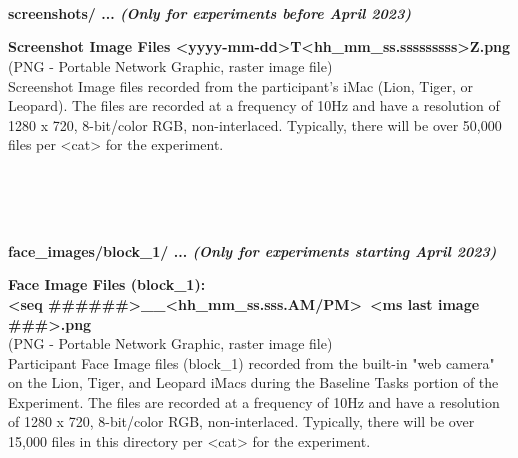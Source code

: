 \begin{description}
\textbf{\\\\\\}
\begin{addmargin}[0em]{0em} %
    \label{screenshots/<yyyy-mm-dd>T<hh_mm_ss.sssssssss>Z.png}
    \textbf{screenshots/ ... \textit{(Only for experiments before April 2023)}}
    \begin{addmargin}[1em]{0em} %
        \textbf{Screenshot Image Files <yyyy-mm-dd>T<hh\_mm\_ss.sssssssss>Z.png}\\
        (PNG - Portable Network Graphic, raster image file)\\
        Screenshot Image files recorded from the participant's iMac (Lion, Tiger, or Leopard).
        The files are recorded at a frequency of 10Hz and have a resolution of 1280 x 720, 8-bit/color RGB, non-interlaced.
        Typically, there will be over 50,000 files per <cat> for the experiment. 
    \end{addmargin} %
\end{addmargin} %


\textbf{\\\\\\}
\begin{addmargin}[0em]{0em} %
    \textbf{face\_images/block\_1/ ... \textit{(Only for experiments starting April 2023)}}

    \begin{addmargin}[1em]{0em} %
        \textbf{Face Image Files (block\_1):\\<seq \#\#\#\#\#\#>\_<yyyy-mm-dd>\_<hh\_mm\_ss.sss.AM/PM>~<ms last image \#\#\#>.png}\\
        (PNG - Portable Network Graphic, raster image file)\\
        Participant Face Image files (block\_1) recorded from the built-in "web camera" on the Lion, Tiger,
        and Leopard iMacs during the Baseline Tasks portion of the Experiment.
        The files are recorded at a frequency of 10Hz and have a resolution of 1280 x 720, 8-bit/color RGB, non-interlaced.
        Typically, there will be over 15,000 files in this directory per <cat> for the experiment. 
    \end{addmargin} %


\end{addmargin}
\end{description}

